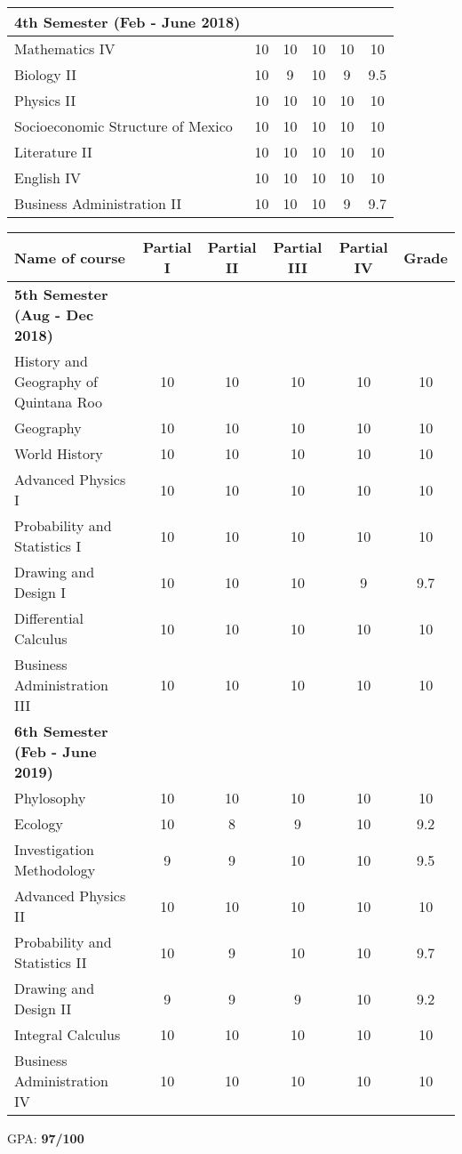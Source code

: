 \documentclass[12pt]{article}
\begin{document}
\begin{center}
\begin{tabular}{| l | c | c | c | c | c |}
\textbf{4th Semester (Feb - June 2018)} & & & & &\\
\hline
Mathematics IV & 10 & 10 & 10 & 10 & 10\\
Biology II & 10 & 9 & 10 & 9 & 9.5\\
Physics II & 10 & 10 & 10 & 10 & 10\\
Socioeconomic Structure of Mexico & 10 & 10 & 10 & 10 & 10\\
Literature II & 10 & 10 & 10 & 10 & 10\\
English IV & 10 & 10 & 10 & 10 & 10\\
Business Administration II & 10 & 10 & 10 & 9 & 9.7\\
\hline
\end{tabular}
\end{center}

\noindent
\newpage

\begin{center}
\begin{tabular}{| l | c | c | c | c | c |}
\hline
Name of course & Partial I & Partial II & Partial III & Partial IV & Grade\\
\hline
\hline

\textbf{5th Semester (Aug - Dec 2018)} & & & & &\\
\hline
History and Geography of Quintana Roo & 10 & 10 & 10 & 10 & 10\\
Geography & 10 & 10 & 10 & 10 & 10\\
World History & 10 & 10 & 10 & 10 & 10\\
Advanced Physics I & 10 & 10 & 10 & 10 & 10\\
Probability and Statistics I & 10 & 10 & 10 & 10 & 10\\
Drawing and Design I & 10 & 10 & 10 & 9 & 9.7\\
Differential Calculus & 10 & 10 & 10 & 10 & 10\\
Business Administration III & 10 & 10 & 10 & 10 & 10\\
\hline
\hline

\textbf{6th Semester (Feb - June 2019)} & & & & &\\
\hline
Phylosophy & 10 & 10 & 10 & 10 & 10\\
Ecology & 10 & 8 & 9 & 10 & 9.2\\
Investigation Methodology & 9 & 9 & 10 & 10 & 9.5\\
Advanced Physics II & 10 & 10 & 10 & 10 & 10\\
Probability and Statistics II & 10 & 9 & 10 & 10 & 9.7\\
Drawing and Design II & 9 & 9 & 9 & 10 & 9.2\\
Integral Calculus & 10 & 10 & 10 & 10 & 10\\
Business Administration IV & 10 & 10 & 10 & 10 & 10\\
\hline

\end{tabular}
\end{center}
\noindent
\hspace*{\fill} GPA: \textbf{97/100}
\end{document}
